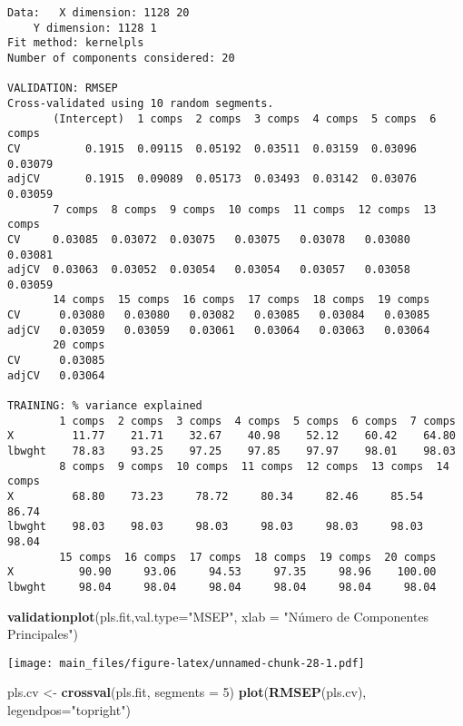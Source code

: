 \documentclass[]{article}
\newenvironment{Shaded}{\begin{snugshade}}{\end{snugshade}}
\newcommand{\KeywordTok}[1]{\textcolor[rgb]{0.13,0.29,0.53}{\textbf{#1}}}
\newcommand{\DataTypeTok}[1]{\textcolor[rgb]{0.13,0.29,0.53}{#1}}
\newcommand{\DecValTok}[1]{\textcolor[rgb]{0.00,0.00,0.81}{#1}}
\newcommand{\StringTok}[1]{\textcolor[rgb]{0.31,0.60,0.02}{#1}}
\newcommand{\NormalTok}[1]{#1}
\begin{document}
\begin{verbatim}
Data:   X dimension: 1128 20 
    Y dimension: 1128 1
Fit method: kernelpls
Number of components considered: 20

VALIDATION: RMSEP
Cross-validated using 10 random segments.
       (Intercept)  1 comps  2 comps  3 comps  4 comps  5 comps  6 comps
CV          0.1915  0.09115  0.05192  0.03511  0.03159  0.03096  0.03079
adjCV       0.1915  0.09089  0.05173  0.03493  0.03142  0.03076  0.03059
       7 comps  8 comps  9 comps  10 comps  11 comps  12 comps  13 comps
CV     0.03085  0.03072  0.03075   0.03075   0.03078   0.03080   0.03081
adjCV  0.03063  0.03052  0.03054   0.03054   0.03057   0.03058   0.03059
       14 comps  15 comps  16 comps  17 comps  18 comps  19 comps
CV      0.03080   0.03080   0.03082   0.03085   0.03084   0.03085
adjCV   0.03059   0.03059   0.03061   0.03064   0.03063   0.03064
       20 comps
CV      0.03085
adjCV   0.03064

TRAINING: % variance explained
        1 comps  2 comps  3 comps  4 comps  5 comps  6 comps  7 comps
X         11.77    21.71    32.67    40.98    52.12    60.42    64.80
lbwght    78.83    93.25    97.25    97.85    97.97    98.01    98.03
        8 comps  9 comps  10 comps  11 comps  12 comps  13 comps  14 comps
X         68.80    73.23     78.72     80.34     82.46     85.54     86.74
lbwght    98.03    98.03     98.03     98.03     98.03     98.03     98.04
        15 comps  16 comps  17 comps  18 comps  19 comps  20 comps
X          90.90     93.06     94.53     97.35     98.96    100.00
lbwght     98.04     98.04     98.04     98.04     98.04     98.04
\end{verbatim}

\begin{Shaded}
\begin{Highlighting}[]
\KeywordTok{validationplot}\NormalTok{(pls.fit,}\DataTypeTok{val.type=}\StringTok{"MSEP"}\NormalTok{, }\DataTypeTok{xlab =} \StringTok{"Número de Componentes Principales"}\NormalTok{)}
\end{Highlighting}
\end{Shaded}

\texttt{[image: main\_files/figure-latex/unnamed-chunk-28-1.pdf]}

\begin{Shaded}
\begin{Highlighting}[]
\NormalTok{pls.cv <-}\StringTok{ }\KeywordTok{crossval}\NormalTok{(pls.fit, }\DataTypeTok{segments =} \DecValTok{5}\NormalTok{)}
\KeywordTok{plot}\NormalTok{(}\KeywordTok{RMSEP}\NormalTok{(pls.cv), }\DataTypeTok{legendpos=}\StringTok{"topright"}\NormalTok{)}
\end{Highlighting}
\end{Shaded}
\end{document}
